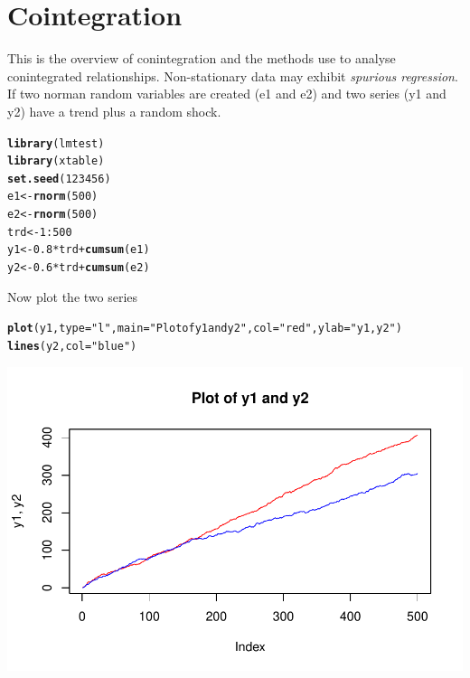 \documentclass{article}\usepackage{graphicx, color}
\makeatletter
\def\maxwidth{ %
  \ifdim\Gin@nat@width>\linewidth
    \linewidth
  \else
    \Gin@nat@width
  \fi
}
\newcommand{\hlfunctioncall}[1]{\textcolor[rgb]{0.501960784313725,0,0.329411764705882}{\textbf{#1}}}%
\newcommand{\hlstring}[1]{\textcolor[rgb]{0.6,0.6,1}{#1}}%
\newenvironment{kframe}{%
 \def\at@end@of@kframe{}%
 \ifinner\ifhmode%
  \def\at@end@of@kframe{\end{minipage}}%
  \begin{minipage}{\columnwidth}%
 \fi\fi%
 \def\FrameCommand##1{\hskip\@totalleftmargin \hskip-\fboxsep
 \colorbox{shadecolor}{##1}\hskip-\fboxsep
     \hskip-\linewidth \hskip-\@totalleftmargin \hskip\columnwidth}%
 \MakeFramed {\advance\hsize-\width
   \@totalleftmargin\z@ \linewidth\hsize
   \@setminipage}}%
 {\par\unskip\endMakeFramed%
 \at@end@of@kframe}
\newenvironment{knitrout}{}{} %
\makeatother
\begin{document}
\section{Cointegration}
This is the overview of conintegration and the methods use to analyse conintegrated relationships. Non-stationary data may exhibit \emph{spurious regression}.  If two norman random variables are created (e1 and e2) and two series (y1 and y2) have a trend plus a random shock. 
\begin{knitrout}
\color{fgcolor}\begin{kframe}
\begin{alltt}
\hlfunctioncall{library}(lmtest)
\hlfunctioncall{library}(xtable)
\hlfunctioncall{set.seed}(123456)
e1 <- \hlfunctioncall{rnorm}(500)
e2 <- \hlfunctioncall{rnorm}(500)
trd <- 1:500
y1 <- 0.8 * trd + \hlfunctioncall{cumsum}(e1)
y2 <- 0.6 * trd + \hlfunctioncall{cumsum}(e2)
\end{alltt}
\end{kframe}
\end{knitrout}

Now plot the two series
\begin{knitrout}
\color{fgcolor}\begin{kframe}
\begin{alltt}
\hlfunctioncall{plot}(y1, type = \hlstring{"l"}, main = \hlstring{"Plot of y1 and y2"}, col = \hlstring{"red"}, ylab = \hlstring{"y1, y2"})
\hlfunctioncall{lines}(y2, col = \hlstring{"blue"})
\end{alltt}
\end{kframe}
\includegraphics[width=\maxwidth]{figure/plot} 

\end{knitrout}
\end{document}

